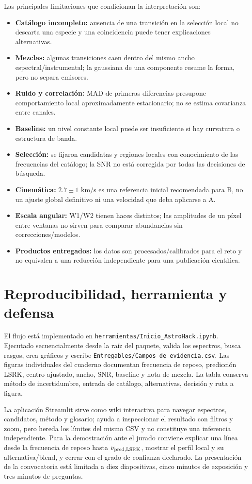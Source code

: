 \documentclass[10pt]{article}
\begin{document}
Las principales limitaciones que condicionan la interpretación son:
\begin{itemize}
  \item \textbf{Catálogo incompleto:} ausencia de una transición en la selección local no descarta una especie y una coincidencia puede tener explicaciones alternativas.
  \item \textbf{Mezclas:} algunas transiciones caen dentro del mismo ancho espectral/instrumental; la gaussiana de una componente resume la forma, pero no separa emisores.
  \item \textbf{Ruido y correlación:} MAD de primeras diferencias presupone comportamiento local aproximadamente estacionario; no se estima covarianza entre canales.
  \item \textbf{Baseline:} un nivel constante local puede ser insuficiente si hay curvatura o estructura de banda.
  \item \textbf{Selección:} se fijaron candidatas y regiones locales con conocimiento de las frecuencias del catálogo; la SNR no está corregida por todas las decisiones de búsqueda.
  \item \textbf{Cinemática:} $2.7\pm1$ km/s es una referencia inicial recomendada para B, no un ajuste global definitivo ni una velocidad que deba aplicarse a A.
  \item \textbf{Escala angular:} W1/W2 tienen haces distintos; las amplitudes de un píxel entre ventanas no sirven para comparar abundancias sin correcciones/modelos.
  \item \textbf{Productos entregados:} los datos son procesados/calibrados para el reto y no equivalen a una reducción independiente para una publicación científica.
\end{itemize}

\section{Reproducibilidad, herramienta y defensa}
El flujo está implementado en \texttt{herramientas/Inicio\_AstroHack.ipynb}. Ejecutado secuencialmente desde la raíz del paquete, valida los espectros, busca rasgos, crea gráficos y escribe \texttt{Entregables/Campos\_de\_evidencia.csv}. Las figuras individuales del cuaderno documentan frecuencia de reposo, predicción LSRK, centro ajustado, ancho, SNR, baseline y nota de mezcla. La tabla conserva método de incertidumbre, entrada de catálogo, alternativas, decisión y ruta a figura.

La aplicación Streamlit sirve como wiki interactiva para navegar espectros, candidatos, método y glosario; ayuda a inspeccionar el resultado con filtros y zoom, pero hereda los límites del mismo CSV y no constituye una inferencia independiente. Para la demostración ante el jurado conviene explicar una línea desde la frecuencia de reposo hasta $\nu_{\rm pred,LSRK}$, mostrar el perfil local y su alternativa/blend, y cerrar con el grado de confianza declarado. La presentación de la convocatoria está limitada a diez diapositivas, cinco minutos de exposición y tres minutos de preguntas.
\end{document}
